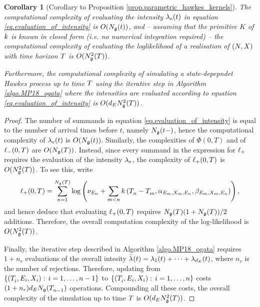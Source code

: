 \documentclass[10pt, article,table]{article}
\newtheorem{corol}[thm]{Corollary}
{\theoremstyle{definition}{
	\newtheorem{remark}[thm]{Remark} 
	\newtheorem{example}[thm]{Example} 
	\newtheorem{exercise}[thm]{Exercise}
	\newtheorem{assumption}[thm]{Assumption}
}}}
\begin{document}
\begin{corol}[Corollary to Proposition \ref{prop.parametric_hawkes_kernels}]
\label{corol.complexities}
The computational complexity of evaluating the intensity $\intensity(t)$ in equation \eqref{eq.evaluation_of_intensity} is $O(\groundProc(t))$, and -- assuming that the primitive $K$ of $\parametricHawkesKernel$ is known in closed form (i.e. no numerical integration required) -- the computational complexity of evaluating the loglikelihood of a realisation of $(\multiCountingProc, \stateVariable)$ with time horizon $\timeHorizon$ is $O(\groundProc\squared(\timeHorizon))$. 

Furthermore, the computational complexity of simulating a state-depepndet Hawkes process up to time $\timeHorizon$ using the iterative step in Algorithm \ref{algo.MP18_ogata} where the intensities are evaluated according to equation \eqref{eq.evaluation_of_intensity} is $O(\numEventTypes\groundProc\squared(\timeHorizon))$.
\end{corol}
\begin{proof}
The number of summands in equation \eqref{eq.evaluation_of_intensity} is equal to the number of arrival times before $t$, namely $\groundProc(t-)$, hence the computational complexity of $\intensity(t)$ is $O(\groundProc(t))$. Similarly, the complexities of $\Phi(0,T)$ and of $\lminus(0,T)$ are $O(\groundProc(T))$. Instead, since every summand in the expression for $\lplus$ requires the evaluation of the intensity $\intensity$, the complexity of $\lplus(0,T)$ is $O(\groundProc\squared(T))$. To see this, write 
\begin{equation*}
 \lplus(0,T) = \sum_{n=1}^{\groundProc(T)}
 \log \left(
 \baseRate_{\event} + \sum_{m < n}\parametricHawkesKernel\left(\arrivalTimes[]_n - \arrivalTimes[]_m, \impCoef_{\event[m],\stateVariable_m,\event[n]}, \decCoef_{\event[m],\stateVariable_m,\event[n]}\right)
 \right),
\end{equation*}
and hence deduce that evaluating $\lplus(0,T)$ requires $\groundProc(T)(1+\groundProc(T))/2$ additions. 
Therefore, the overall computation complexity of the log-likelihood is $O(\groundProc\squared(T))$.

Finally, the iterative step described in Algorithm \ref{algo.MP18_ogata} requires $1+n_r$ evaluations of the overall intesity $\bar{\intensity[]}(t) = \intensity[1](t)+\dots+\intensity[\numEventTypes](t)$, where $n_r$ is the number of rejections. Therefore, updating from $\lbrace(\arrivalTimes[]_i,\event[i],\stateVariable_i): \, i=1,\dots,n-1\rbrace$ to $\lbrace(\arrivalTimes[]_i,\event[i],\stateVariable_i): \, i=1,\dots,n\rbrace$ costs $(1+n_r)\numEventTypes\groundProc(\arrivalTimes[]_{n-1})$ operations. Compounding all these costs, the overall complexity of the simulation up to time $\timeHorizon$ is $O(\numEventTypes\groundProc\squared(\timeHorizon))$. 
\end{proof}
\end{document}
